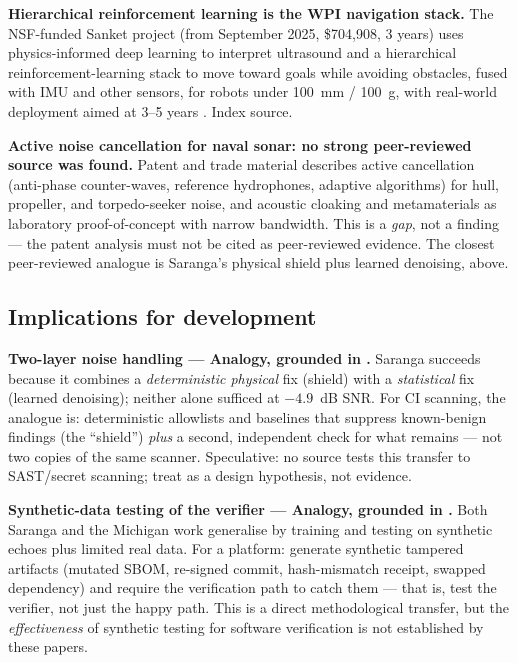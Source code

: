 \documentclass[11pt]{article}
\begin{document}
\textbf{Hierarchical reinforcement learning is the WPI navigation
stack.} The NSF-funded Sanket project (from September 2025, \$704,908,
3 years) uses physics-informed deep learning to interpret ultrasound and
a hierarchical reinforcement-learning stack to move toward goals while
avoiding obstacles, fused with IMU and other sensors, for robots under
100~mm / 100~g, with real-world deployment aimed at 3--5 years
\cite{wpi2025}. Index source.

\textbf{Active noise cancellation for naval sonar: no strong
peer-reviewed source was found.} Patent and trade material describes
active cancellation (anti-phase counter-waves, reference hydrophones,
adaptive algorithms) for hull, propeller, and torpedo-seeker noise, and
acoustic cloaking and metamaterials as laboratory proof-of-concept with
narrow bandwidth. This is a \emph{gap}, not a finding --- the patent
analysis must not be cited as peer-reviewed evidence. The closest
peer-reviewed analogue is Saranga's physical shield plus learned
denoising, above.

\subsection{Implications for development}

\textbf{Two-layer noise handling --- Analogy, grounded in
\cite{saranga2026}.} Saranga succeeds because it combines a
\emph{deterministic physical} fix (shield) with a \emph{statistical}
fix (learned denoising); neither alone sufficed at $-4.9$~dB SNR. For CI
scanning, the analogue is: deterministic allowlists and baselines that
suppress known-benign findings (the ``shield'') \emph{plus} a second,
independent check for what remains --- not two copies of the same
scanner. Speculative: no source tests this transfer to SAST/secret
scanning; treat as a design hypothesis, not evidence.

\textbf{Synthetic-data testing of the verifier --- Analogy, grounded in
\cite{saranga2026,michigan2025}.} Both Saranga and the Michigan work
generalise by training and testing on synthetic echoes plus limited real
data. For a platform: generate synthetic tampered artifacts (mutated
SBOM, re-signed commit, hash-mismatch receipt, swapped dependency) and
require the verification path to catch them --- that is, test the
verifier, not just the happy path. This is a direct methodological
transfer, but the \emph{effectiveness} of synthetic testing for software
verification is not established by these papers.
\end{document}
